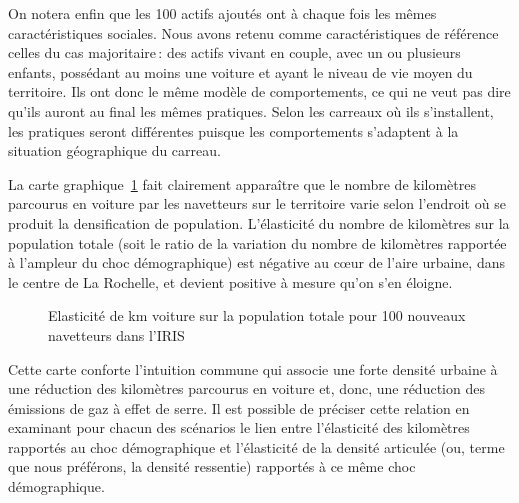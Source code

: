 \documentclass[
  9pt,
  a4paper,
  DIV=11]{scrreprt}
\begin{document}
On notera enfin que les 100 actifs ajoutés ont à chaque fois les mêmes
caractéristiques sociales. Nous avons retenu comme caractéristiques de
référence celles du cas majoritaire\,: des actifs vivant en couple, avec
un ou plusieurs enfants, possédant au moins une voiture et ayant le
niveau de vie moyen du territoire. Ils ont donc le même modèle de
comportements, ce qui ne veut pas dire qu'ils auront au final les mêmes
pratiques. Selon les carreaux où ils s'installent, les pratiques seront
différentes puisque les comportements s'adaptent à la situation
géographique du carreau.

La carte graphique~\ref{fig-elas-km-pop} fait clairement apparaître que
le nombre de kilomètres parcourus en voiture par les navetteurs sur le
territoire varie selon l'endroit où se produit la densification de
population. L'élasticité du nombre de kilomètres sur la population
totale (soit le ratio de la variation du nombre de kilomètres rapportée
à l'ampleur du choc démographique) est négative au cœur de l'aire
urbaine, dans le centre de La Rochelle, et devient positive à mesure
qu'on s'en éloigne.

\begin{figure}[htb]

\caption{\label{fig-elas-km-pop}Elasticité de km voiture sur la
population totale pour 100 nouveaux navetteurs dans l'IRIS}


\end{figure}%

Cette carte conforte l'intuition commune qui associe une forte densité
urbaine à une réduction des kilomètres parcourus en voiture et, donc,
une réduction des émissions de gaz à effet de serre. Il est possible de
préciser cette relation en examinant pour chacun des scénarios le lien
entre l'élasticité des kilomètres rapportés au choc démographique et
l'élasticité de la densité articulée (ou, terme que nous préférons, la
densité ressentie) rapportés à ce même choc démographique.
\end{document}
